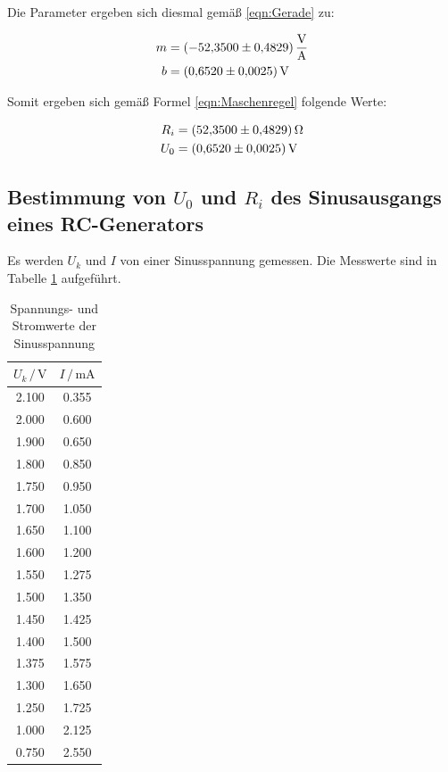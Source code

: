 Die Parameter ergeben sich diesmal gemäß \ref{eqn:Gerade} zu: 

\begin{align*}
m &= \SI{-52.350+-0.4829}{\volt\per\ampere}\\
b &= \SI{0.652+-0.0025}{\volt}
\end{align*}

Somit ergeben sich gemäß Formel \ref{eqn:Maschenregel} folgende Werte:

\begin{align*}
R_i &= \SI{52.350+-0.4829}{\ohm}\\
U_0 &= \SI{0.652+-0.0025}{\volt}
\end{align*}

\subsection{Bestimmung von $U_0$ und $R_i$ des Sinusausgangs eines RC-Generators}

Es werden $U_k$ und $I$ von einer Sinusspannung gemessen. Die Messwerte
sind in Tabelle \ref{tab:Sinus} aufgeführt.

\begin{table}
   \centering
   \caption{Spannungs- und Stromwerte der Sinusspannung}
   \label{tab:Sinus}
   \begin{tabular}{c c}
     \toprule
      $U_k \,/\, \si{\volt}$ & $I \,/\, \si{\milli\ampere}$\\
     \midrule
       2.100 & 0.355\\
       2.000 & 0.600\\
       1.900 & 0.650\\
       1.800 & 0.850\\
       1.750 & 0.950\\
       1.700 & 1.050\\
       1.650 & 1.100\\
       1.600 & 1.200\\
       1.550 & 1.275\\
       1.500 & 1.350\\
       1.450 & 1.425\\
       1.400 & 1.500\\
       1.375 & 1.575\\
       1.300 & 1.650\\
       1.250 & 1.725\\
       1.000 & 2.125\\
       0.750 & 2.550\\
     \bottomrule
   \end{tabular}
 \end{table}

